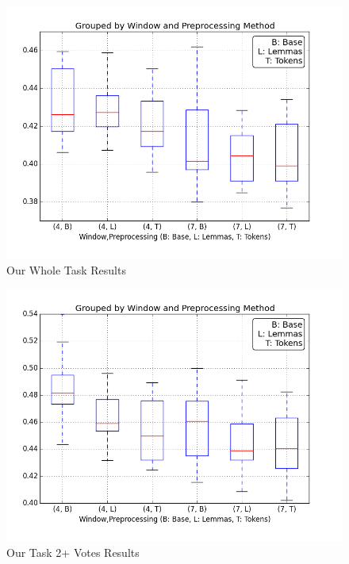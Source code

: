 \begin{figure}
  \includegraphics[width=\linewidth]{results_spearman/ar_similiarity_task_results_spearplot.png}
  \caption{Our Whole Task Results}
  \label{fig:spearplot1}
\end{figure}

\begin{figure}
  \includegraphics[width=\linewidth]{results_spearman/ar_similiarity_task_multi_results_spearplot.png}
  \caption{Our Task 2+ Votes Results}
  \label{fig:spearplot2}
\end{figure}

